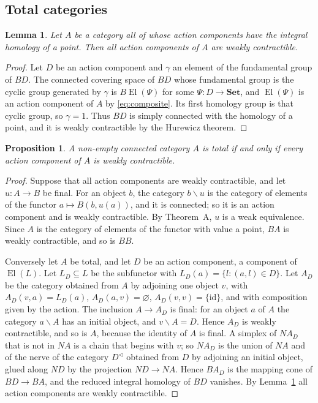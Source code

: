 \documentclass[11pt,a4paper]{article}
\newtheorem{proposition}[theorem]{Proposition}
\newtheorem{lemma}[theorem]{Lemma}
\theoremstyle{definition}
\newcommand{\El}{\operatorname{El}}
\newcommand{\id}{\mathrm{id}}
\newcommand{\Set}{\mathbf{Set}}
\begin{document}
\subsection{Total categories}

\begin{lemma}\label{lem:acyclic}
Let $A$ be a category all of whose action components have the integral
homology of a point. Then all action components of $A$ are weakly
contractible.
\end{lemma}

\begin{proof}
Let $D$ be an action component and $\gamma$ an element of the fundamental
group of $BD$. The connected covering space of $BD$ whose fundamental group
is the cyclic group generated by $\gamma$ is $B\El(\Psi)$ for some
$\Psi\colon D\to\Set$, and $\El(\Psi)$ is an action component of $A$ by
\eqref{eq:composite}. Its first homology group is that cyclic group, so
$\gamma=1$. Thus $BD$ is simply connected with the homology of a point, and
it is weakly contractible by the Hurewicz theorem.
\end{proof}

\begin{proposition}\label{prop:total}
A non-empty connected category $A$ is total if and only if every action
component of $A$ is weakly contractible.
\end{proposition}

\begin{proof}
Suppose that all action components are weakly contractible, and let
$u\colon A\to B$ be final. For an object $b$, the category $b\backslash u$ is
the category of elements of the functor $a\mapsto B(b,u(a))$, and it is
connected; so it is an action component and is weakly contractible. By
Theorem~A, $u$ is a weak equivalence. Since $A$ is the category of elements
of the functor with value a point, $BA$ is weakly contractible, and so is
$BB$.

Conversely let $A$ be total, and let $D$ be an action component, a component
of $\El(L)$. Let $L_D\subseteq L$ be the subfunctor with
$L_D(a)=\{l:(a,l)\in D\}$. Let $A_D$ be the category obtained from $A$ by
adjoining one object $v$, with $A_D(v,a)=L_D(a)$, $A_D(a,v)=\varnothing$,
$A_D(v,v)=\{\id\}$, and with composition given by the action. The inclusion
$A\to A_D$ is final: for an object $a$ of $A$ the category $a\backslash A$
has an initial object, and $v\backslash A=D$. Hence $A_D$ is weakly
contractible, and so is $A$, because the identity of $A$ is final. A simplex
of $NA_D$ that is not in $NA$ is a chain that begins with $v$; so $NA_D$ is
the union of $NA$ and of the nerve of the category $D^{\triangleleft}$
obtained from $D$ by adjoining an initial object, glued along $ND$ by the
projection $ND\to NA$. Hence $BA_D$ is the mapping cone of $BD\to BA$, and
the reduced integral homology of $BD$ vanishes. By Lemma~\ref{lem:acyclic}
all action components are weakly contractible.
\end{proof}
\end{document}
